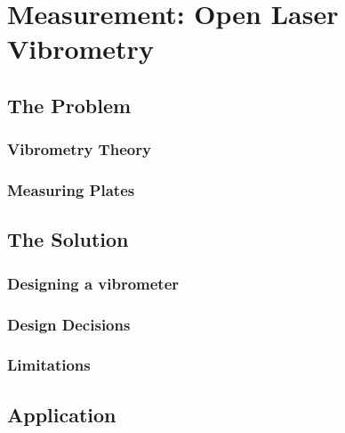 %
%
%



\chapter{Measurement: Open Laser Vibrometry}\label{measurement-open-laser-vibrometry}

\section{The Problem}\label{the-problem-1}

\subsection{Vibrometry Theory}\label{vibrometry-theory}

\subsection{Measuring Plates}\label{measuring-plates}

\section{The Solution}\label{the-solution}

\subsection{Designing a vibrometer}\label{designing-a-vibrometer}

\subsection{Design Decisions}\label{design-decisions}

\subsection{Limitations}\label{limitations}

\section{Application}\label{application}

